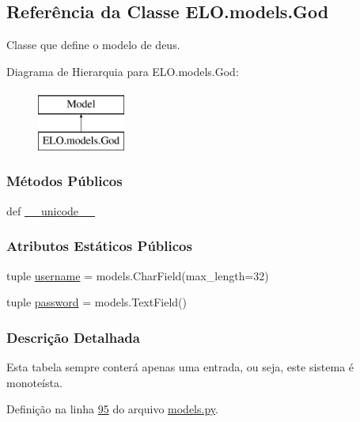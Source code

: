 \hypertarget{classELO_1_1models_1_1God}{\subsection{Referência da Classe E\-L\-O.\-models.\-God}
\label{classELO_1_1models_1_1God}
}


Classe que define o modelo de deus.  


Diagrama de Hierarquia para E\-L\-O.\-models.\-God\-:\begin{figure}[H]
\begin{center}
\leavevmode
\includegraphics[height=2.000000cm]{d2/d8b/classELO_1_1models_1_1God}
\end{center}
\end{figure}
\subsubsection*{Métodos Públicos}
\begin{DoxyCompactItemize}
\item 
def \hyperlink{classELO_1_1models_1_1God_aec7e462406b98293c953589a3a368825}{\-\_\-\-\_\-unicode\-\_\-\-\_\-}
\end{DoxyCompactItemize}
\subsubsection*{Atributos Estáticos Públicos}
\begin{DoxyCompactItemize}
\item 
tuple \hyperlink{classELO_1_1models_1_1God_a8b9ebc1601b71f2b52e72c9fbd3030bc}{username} = models.\-Char\-Field(max\-\_\-length=32)
\item 
tuple \hyperlink{classELO_1_1models_1_1God_ae566fce421f4a31517a053af2abcff31}{password} = models.\-Text\-Field()
\end{DoxyCompactItemize}


\subsubsection{Descrição Detalhada}
Esta tabela sempre conterá apenas uma entrada, ou seja, este sistema é monoteísta. 

Definição na linha \hyperlink{ELO_2models_8py_source_l00095}{95} do arquivo \hyperlink{ELO_2models_8py_source}{models.\-py}.



